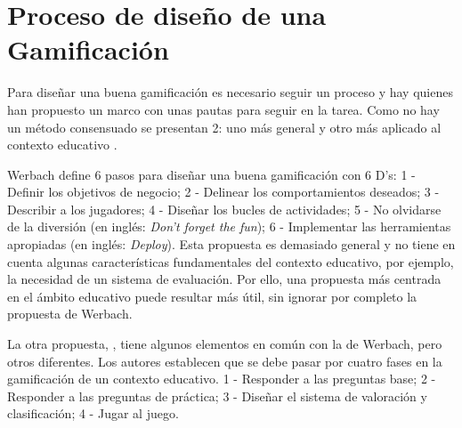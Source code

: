 

\section{Proceso de diseño de una Gamificación}

Para diseñar una buena gamificación es necesario seguir un proceso y hay quienes han propuesto un marco con unas pautas para seguir en la tarea. 
%
Como no hay un método consensuado se presentan 2: uno más general  \citep{werbach2012win} y otro más aplicado al contexto educativo  \citep*{kapp2013gamification}.

Werbach define 6 pasos para diseñar una buena gamificación con 6 D's: 
1 - Definir los objetivos de negocio; 2 - Delinear los comportamientos deseados; 3 - Describir a los jugadores; 4 - Diseñar los bucles de actividades; 5 - No olvidarse de la diversión (en inglés: \textit{Don't forget the fun}); 6 - Implementar las herramientas apropiadas (en inglés: \textit{Deploy}).
%
Esta propuesta es demasiado general y no tiene en cuenta algunas características fundamentales del contexto educativo, por ejemplo, la necesidad de un sistema de evaluación.
%
Por ello, una propuesta más centrada en el ámbito educativo puede resultar más útil, sin ignorar por completo la propuesta de Werbach.

La otra propuesta,  \cite{kapp2013gamification}, tiene algunos elementos en común con la de Werbach, pero otros diferentes. 
%
Los autores establecen que se debe pasar por cuatro fases en la gamificación de un contexto educativo. 1 - Responder a las preguntas base; 2 - Responder a las preguntas de práctica; 3 - Diseñar el sistema de valoración y clasificación; 4 - Jugar al juego.

